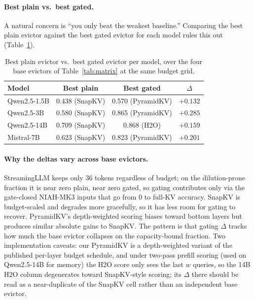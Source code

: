 \documentclass{article}
\begin{document}
\paragraph{Best plain vs.\ best gated.} A natural concern is ``you
only beat the weakest baseline.'' Comparing the best plain evictor against the
best gated evictor for each model rules this out (Table~\ref{tab:bestplain}).

\begin{table}[t]
\centering
\caption{Best plain evictor vs.\ best gated evictor per model, over
the four base evictors of Table~\ref{tab:matrix} at the same budget grid.}
\label{tab:bestplain}
\begin{tabular}{lccc}
\toprule
Model & Best plain & Best gated & $\Delta$ \\
\midrule
Qwen2.5-1.5B & 0.438 (SnapKV)    & 0.570 (PyramidKV) & $+0.132$ \\
Qwen2.5-3B   & 0.580 (SnapKV)    & 0.865 (PyramidKV) & $+0.285$ \\
Qwen2.5-14B  & 0.709 (SnapKV)    & 0.868 (H2O)       & $+0.159$ \\
Mistral-7B    & 0.623 (SnapKV)    & 0.823 (PyramidKV) & $+0.201$ \\
\bottomrule
\end{tabular}
\end{table}

\paragraph{Why the deltas vary across base evictors.} StreamingLLM keeps only
$36$ tokens regardless of budget; on the dilution-prone fraction it is near
zero plain, near zero gated, so gating contributes only via the gate-closed
NIAH-MK3 inputs that go from $0$ to full-KV accuracy. SnapKV is budget-scaled
and degrades more gracefully, so it has less room for gating to recover.
PyramidKV's depth-weighted scoring biases toward bottom layers but produces
similar absolute gains to SnapKV. The pattern is that gating $\Delta$ tracks how
much the base evictor collapses on the capacity-bound fraction. Two
implementation caveats: our PyramidKV is a depth-weighted variant of the
published per-layer budget schedule, and under two-pass prefill scoring
(used on Qwen2.5-14B for memory) the H2O score only sees the last $w$
queries, so the 14B H2O column degenerates toward SnapKV-style scoring; its
$\Delta$ there should be read as a near-duplicate of the SnapKV cell rather
than an independent base evictor.
\end{document}
